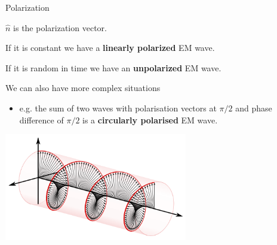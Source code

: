 \begin{frame}{Polarization}

$\hat{n}$ is the polarization vector.\\
\vspace{0.2cm}
\begin{itemize}
{\small
\item
If it is constant we have a {\bf linearly polarized} EM  wave.
\item
If it is random in time we have an {\bf unpolarized} EM wave.
\item
We can also have more complex situations
  \begin{itemize}
        \item e.g. the sum of two waves with polarisation vectors at $\pi/2$ and phase
                  difference of $\pi/2$ is a {\bf circularly polarised} EM wave.
  \end{itemize}
}
\end{itemize}

\begin{center}
    \includegraphics[width=0.60\textwidth]{./images/schematics/wave_circular_polarization.png}\\
\end{center}

\end{frame}

%
%
%

